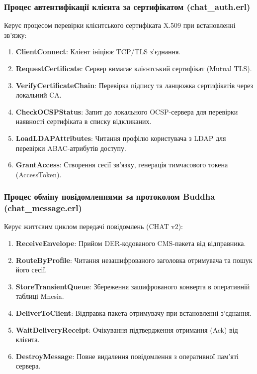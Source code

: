 \documentclass{article}
\begin{document}
\subsubsection{Процес автентифікації клієнта за сертифікатом (chat\_auth.erl)}
Керує процесом перевірки клієнтського сертифіката X.509 при встановленні зв'язку:
\begin{enumerate}
    \item \textbf{ClientConnect}: Клієнт ініціює TCP/TLS з'єднання.
    \item \textbf{RequestCertificate}: Сервер вимагає клієнтський сертифікат (Mutual TLS).
    \item \textbf{VerifyCertificateChain}: Перевірка підпису та ланцюжка сертифікатів через локальний CA.
    \item \textbf{CheckOCSPStatus}: Запит до локального OCSP-сервера для перевірки наявності сертифіката в списку відкликаних.
    \item \textbf{LoadLDAPAttributes}: Читання профілю користувача з LDAP для перевірки ABAC-атрибутів доступу.
    \item \textbf{GrantAccess}: Створення сесії зв'язку, генерація тимчасового токена (AccessToken).
\end{enumerate}

\subsubsection{Процес обміну повідомленнями за протоколом Buddha (chat\_message.erl)}
Керує життєвим циклом передачі повідомлень (CHAT v2):
\begin{enumerate}
    \item \textbf{ReceiveEnvelope}: Прийом DER-кодованого CMS-пакета від відправника.
    \item \textbf{RouteByProfile}: Читання незашифрованого заголовка отримувача та пошук його сесії.
    \item \textbf{StoreTransientQueue}: Збереження зашифрованого конверта в оперативній таблиці Mnesia.
    \item \textbf{DeliverToClient}: Відправка пакета отримувачу при встановленні з'єднання.
    \item \textbf{WaitDeliveryReceipt}: Очікування підтвердження отримання (Ack) від клієнта.
    \item \textbf{DestroyMessage}: Повне видалення повідомлення з оперативної пам'яті сервера.
\end{enumerate}
\end{document}
